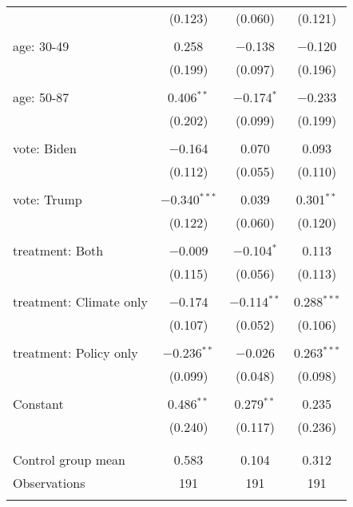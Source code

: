 \begin{tabular}{@{\extracolsep{5pt}}lccc}
  & (0.123) & (0.060) & (0.121) \\ 
  & & & \\ 
 age: 30-49 & 0.258 & $-$0.138 & $-$0.120 \\ 
  & (0.199) & (0.097) & (0.196) \\ 
  & & & \\ 
 age: 50-87 & 0.406$^{**}$ & $-$0.174$^{*}$ & $-$0.233 \\ 
  & (0.202) & (0.099) & (0.199) \\ 
  & & & \\ 
 vote: Biden & $-$0.164 & 0.070 & 0.093 \\ 
  & (0.112) & (0.055) & (0.110) \\ 
  & & & \\ 
 vote: Trump & $-$0.340$^{***}$ & 0.039 & 0.301$^{**}$ \\ 
  & (0.122) & (0.060) & (0.120) \\ 
  & & & \\ 
 treatment: Both & $-$0.009 & $-$0.104$^{*}$ & 0.113 \\ 
  & (0.115) & (0.056) & (0.113) \\ 
  & & & \\ 
 treatment: Climate only & $-$0.174 & $-$0.114$^{**}$ & 0.288$^{***}$ \\ 
  & (0.107) & (0.052) & (0.106) \\ 
  & & & \\ 
 treatment: Policy only & $-$0.236$^{**}$ & $-$0.026 & 0.263$^{***}$ \\ 
  & (0.099) & (0.048) & (0.098) \\ 
  & & & \\ 
 Constant & 0.486$^{**}$ & 0.279$^{**}$ & 0.235 \\ 
  & (0.240) & (0.117) & (0.236) \\ 
  & & & \\ 
\hline \\[-1.8ex] 
Control group mean & 0.583 & 0.104 & 0.312 \\ 
Observations & 191 & 191 & 191 \\ 
\hline 
\hline \\[-1.8ex] 
\end{tabular} 
